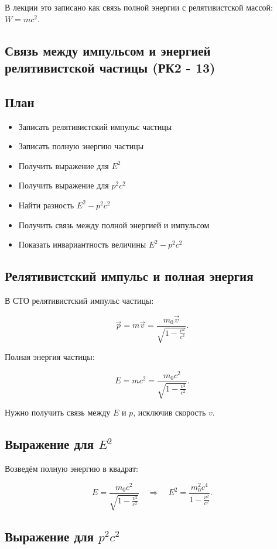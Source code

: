 \documentclass[a4paper,12pt]{article}
\begin{document}
В лекции это записано как связь полной энергии с релятивистской массой: $W=mc^2$.

\subsection{Связь между импульсом и энергией релятивистской частицы (РК2 - 13)}

\subsection*{План}
\begin{itemize}
\item Записать релятивистский импульс частицы
\item Записать полную энергию частицы
\item Получить выражение для $E^2$
\item Получить выражение для $p^2c^2$
\item Найти разность $E^2-p^2c^2$
\item Получить связь между полной энергией и импульсом
\item Показать инвариантность величины $E^2-p^2c^2$
\end{itemize}

\subsection*{Релятивистский импульс и полная энергия}

В СТО релятивистский импульс частицы:

\[
\vec p
=
m\vec v
=
\frac{m_0\vec v}{\sqrt{1-\frac{v^2}{c^2}}}.
\]

Полная энергия частицы:

\[
E
=
mc^2
=
\frac{m_0c^2}{\sqrt{1-\frac{v^2}{c^2}}}.
\]

Нужно получить связь между $E$ и $p$, исключив скорость $v$.

\subsection*{Выражение для $E^2$}

Возведём полную энергию в квадрат:

\[
E
=
\frac{m_0c^2}{\sqrt{1-\frac{v^2}{c^2}}}
\quad \Rightarrow \quad
E^2
=
\frac{m_0^2c^4}{1-\frac{v^2}{c^2}}.
\]

\subsection*{Выражение для $p^2c^2$}
\end{document}
